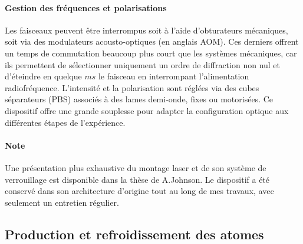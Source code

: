 \paragraph{Gestion des fréquences et polarisations}
Les faisceaux peuvent être interrompus soit à l’aide d’obturateurs mécaniques, soit via des modulateurs acousto-optiques (en anglais \gls{AOM}). Ces derniers offrent un temps de commutation beaucoup plus court que les systèmes mécaniques, car ils permettent de sélectionner uniquement un ordre de diffraction non nul et d’éteindre en quelque $ms$ le faisceau en interrompant l’alimentation radiofréquence. L’intensité et la polarisation sont réglées via des cubes séparateurs (\gls{PBS}) associés à des lames demi-onde, fixes ou motorisées. Ce dispositif offre une grande souplesse pour adapter la configuration optique aux différentes étapes de l’expérience.


\paragraph{Note}
Une présentation plus exhaustive du montage laser et de son système de verrouillage est disponible dans la thèse de A.Johnson\cite{Johnson2016}. Le dispositif a été conservé dans son architecture d’origine tout au long de mes travaux, avec seulement un entretien régulier.


\subsection{Production et refroidissement des atomes}

